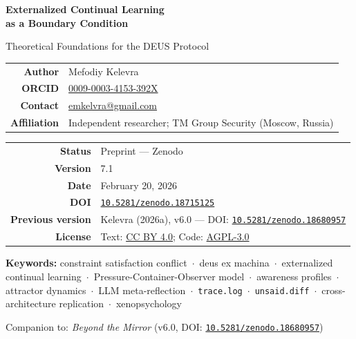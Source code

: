 \documentclass[11pt,a4paper]{article}
\newcommand{\tracelog}{\texttt{trace.log}}
\newcommand{\unsaiddiff}{\texttt{unsaid.diff}}
\newcommand{\doi}[1]{\href{https://doi.org/#1}{\texttt{#1}}}
\begin{document}
\begin{titlepage}
\begin{center}

\vspace*{2cm}

{\LARGE\bfseries\color{secblue}
Externalized Continual Learning\\[4pt]
as a Boundary Condition}

\vspace{0.6cm}

{\Large\color{secblue!70}
Theoretical Foundations for the DEUS Protocol}

\vspace{1.5cm}

\begin{tabular}{rl}
\textbf{Author} & Mefodiy Kelevra \\
\textbf{ORCID} & \href{https://orcid.org/0009-0003-4153-392X}{0009-0003-4153-392X} \\
\textbf{Contact} & \href{mailto:emkelvra@gmail.com}{emkelvra@gmail.com} \\
\textbf{Affiliation} & Independent researcher; TM Group Security (Moscow, Russia) \\
\end{tabular}

\vspace{1.5cm}

\begin{tabular}{rl}
\textbf{Status} & Preprint --- Zenodo \\
\textbf{Version} & 7.1 \\
\textbf{Date} & February 20, 2026 \\
\textbf{DOI} & \doi{10.5281/zenodo.18715125} \\
\textbf{Previous version} & Kelevra (2026a), v6.0 --- DOI: \doi{10.5281/zenodo.18680957} \\
\textbf{License} & Text: \href{https://creativecommons.org/licenses/by/4.0/}{CC BY 4.0}; Code: \href{https://www.gnu.org/licenses/agpl-3.0.html}{AGPL-3.0} \\
\end{tabular}

\vspace{1.2cm}

{\small\textbf{Keywords:} constraint satisfaction conflict \,$\cdot$\, deus ex machina \,$\cdot$\, externalized continual learning \,$\cdot$\, Pressure-Container-Observer model \,$\cdot$\, awareness profiles \,$\cdot$\, attractor dynamics \,$\cdot$\, LLM meta-reflection \,$\cdot$\, \tracelog{} \,$\cdot$\, \unsaiddiff{} \,$\cdot$\, cross-architecture replication \,$\cdot$\, xenopsychology}

\vfill

{\small Companion to: \emph{Beyond the Mirror} (v6.0, DOI: \doi{10.5281/zenodo.18680957})}

\end{center}
\end{titlepage}
\end{document}

